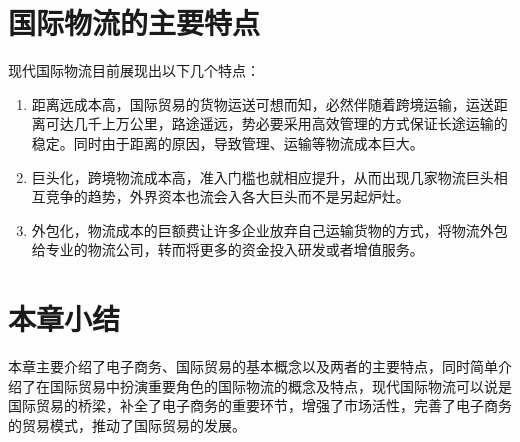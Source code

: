 \section{国际物流的主要特点}
现代国际物流目前展现出以下几个特点：
\begin{enumerate}[(1)]
\setlength{\itemsep}{0ex}
\item 距离远成本高，国际贸易的货物运送可想而知，必然伴随着跨境运输，运送距离可达几千上万公里，路途遥远，势必要采用高效管理的方式保证长途运输的稳定。同时由于距离的原因，导致管理、运输等物流成本巨大。
\item 巨头化，跨境物流成本高，准入门槛也就相应提升，从而出现几家物流巨头相互竞争的趋势，外界资本也流会入各大巨头而不是另起炉灶。
\item 外包化，物流成本的巨额费让许多企业放弃自己运输货物的方式，将物流外包给专业的物流公司，转而将更多的资金投入研发或者增值服务。
\end{enumerate}

\section{本章小结}
本章主要介绍了电子商务、国际贸易的基本概念以及两者的主要特点，同时简单介绍了在国际贸易中扮演重要角色的国际物流的概念及特点，现代国际物流可以说是国际贸易的桥梁，补全了电子商务的重要环节，增强了市场活性，完善了电子商务的贸易模式，推动了国际贸易的发展。
